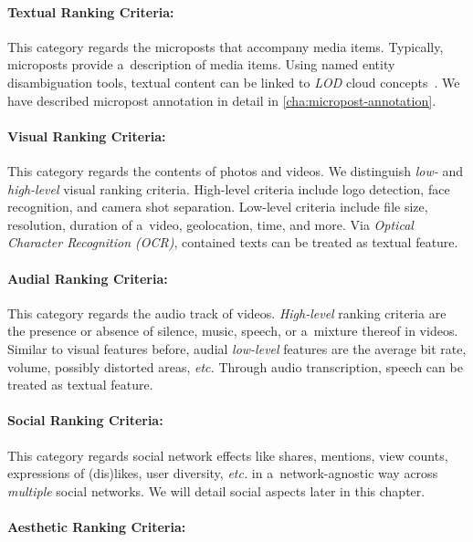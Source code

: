 \paragraph{Textual Ranking Criteria:}

This category regards the microposts that accompany media items.
Typically, microposts provide a~description of media items.
Using named entity disambiguation tools,
textual content can be linked to \emph{LOD} cloud concepts~\cite{steiner2011addingmeaning}.
We have described micropost annotation in detail in \autoref{cha:micropost-annotation}.

\paragraph{Visual Ranking Criteria:} \label{sec:visualrankingcriteria}

This category regards the contents of photos and videos.
We distinguish \emph{low-} and \emph{high-level} visual ranking criteria.
High-level criteria include logo detection,
face recognition, and camera shot separation.
Low-level criteria include file size, resolution,
duration of a~video, geolocation, time, and more.
Via \emph{Optical Character Recognition (OCR)}, contained texts can be treated as textual feature.

\paragraph{Audial Ranking Criteria:}

This category regards the audio track of videos.
\emph{High-level} ranking criteria are the presence or absence
of silence, music, speech, or a~mixture thereof in videos.
Similar to visual features before,
audial \emph{low-level} features are the average bit rate,
volume, possibly distorted areas, \emph{etc.}
Through audio transcription, speech can be treated as textual feature.

\paragraph{Social Ranking Criteria:}

This category regards social network effects like shares, mentions,
view counts, expressions of (dis)likes, user diversity, \emph{etc.}
in a~network-agnostic way across \emph{multiple} social networks.
We will detail social aspects later in this chapter.

\paragraph{Aesthetic Ranking Criteria:}

